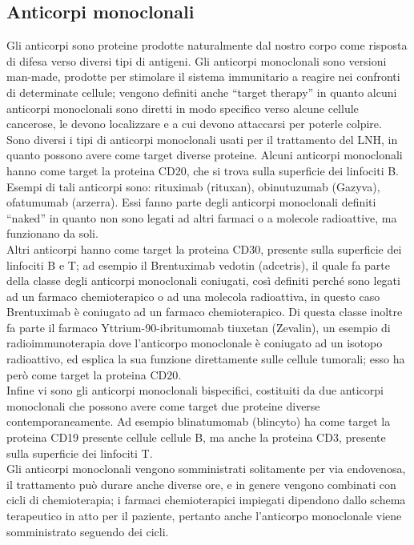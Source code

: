 \subsection{Anticorpi monoclonali}
Gli anticorpi sono proteine prodotte naturalmente dal nostro corpo come risposta di difesa verso diversi tipi di 
antigeni. Gli anticorpi monoclonali sono versioni man-made, prodotte per stimolare il sistema immunitario a reagire 
nei confronti di determinate cellule; vengono definiti anche “target therapy” in quanto alcuni anticorpi monoclonali 
sono diretti in modo specifico verso alcune cellule cancerose, le devono localizzare e a cui devono attaccarsi per 
poterle colpire\cite{IMMUNOTP}.\\
Sono diversi i tipi di anticorpi monoclonali usati per il trattamento del LNH, in quanto possono avere come target 
diverse proteine. 
Alcuni anticorpi monoclonali hanno come target la proteina CD20, che si trova sulla superficie dei linfociti B. 
Esempi di tali anticorpi sono: rituximab (rituxan), obinutuzumab (Gazyva), ofatumumab (arzerra). 
Essi fanno parte degli anticorpi monoclonali definiti “naked” in quanto non sono legati ad altri farmaci o a 
molecole radioattive, ma funzionano da soli\cite{LLSIMMUNO}.\\
Altri anticorpi hanno come target la proteina CD30, presente sulla superficie dei linfociti B e T; 
ad esempio il Brentuximab vedotin (adcetris), il quale fa parte della classe degli anticorpi monoclonali coniugati, 
così definiti perché sono legati ad un farmaco chemioterapico o ad una molecola radioattiva, in questo caso 
Brentuximab è coniugato ad un farmaco chemioterapico. Di questa classe inoltre fa parte il farmaco 
Yttrium-90-ibritumomab tiuxetan (Zevalin), un esempio di radioimmunoterapia dove l’anticorpo monoclonale è coniugato 
ad un isotopo radioattivo, ed esplica la sua funzione direttamente sulle cellule tumorali; esso ha però come target 
la proteina CD20\cite{LLSIMMUNO}.\\
Infine vi sono gli anticorpi monoclonali bispecifici, costituiti da due anticorpi monoclonali che possono avere come 
target due proteine diverse contemporaneamente. Ad esempio blinatumomab (blincyto) ha come target la proteina CD19 
presente cellule cellule B, ma anche la proteina CD3, presente sulla superficie dei linfociti T\cite{LLSIMMUNO}.\\
Gli anticorpi monoclonali vengono somministrati solitamente per via endovenosa, il trattamento può durare anche 
diverse ore, e in genere vengono combinati con cicli di chemioterapia; i farmaci chemioterapici impiegati dipendono 
dallo schema terapeutico in atto per il paziente, pertanto anche l’anticorpo monoclonale viene somministrato 
seguendo dei cicli\cite{IMMUNOTP}.\\

